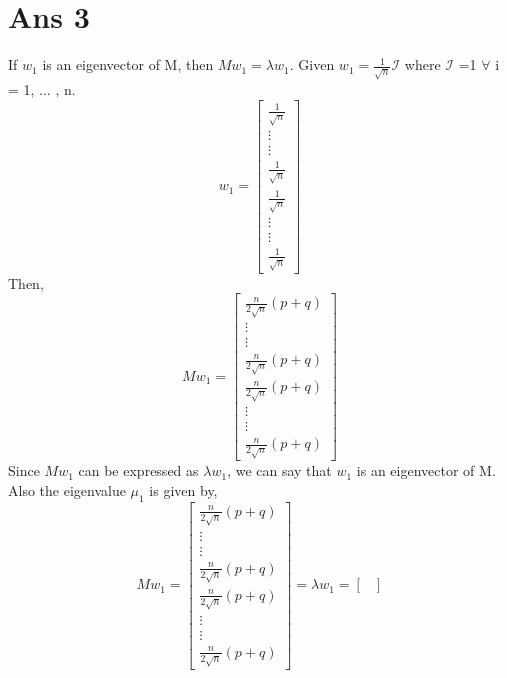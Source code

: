 \documentclass[10pt]{article}
\begin{document}
\section*{Ans 3}
\begin{flushleft}
If $w_{1}$ is an eigenvector of M, then $Mw_{1} = \lambda w_{1}$. Given $w_{1} = \frac{1}{\sqrt n} \mathcal{I}$ where $\mathcal{I}$ =1 $\forall$ i = 1, $\hdots$ , n.\\
\vspace{0.5em}
$$ w_{1} = 
\begin{bmatrix}
\frac{1}{\sqrt n}\\
\vdots\\
\vdots\\
\frac{1}{\sqrt n}\\
\frac{1}{\sqrt n}\\
\vdots\\
\vdots\\
\frac{1}{\sqrt n}
\end{bmatrix}
$$
Then, \\
\vspace{0.5em}
$$ Mw_{1} = 
\begin{bmatrix}
\frac{n}{2 \sqrt n} (p+q)\\
\vdots\\
\vdots\\
\frac{n}{2 \sqrt n} (p+q)\\
\frac{n}{2 \sqrt n} (p+q)\\
\vdots\\
\vdots\\
\frac{n}{2 \sqrt n} (p+q)
\end{bmatrix}
$$
Since $Mw_{1}$ can be expressed as $\lambda w_{1}$, we can say that $w_{1}$ is an eigenvector of M. \\
\vspace{0.5em}
Also the eigenvalue $\mu_{1}$ is given by,\\
\vspace{0.5em}
$$ Mw_{1} = 
\begin{bmatrix}
\frac{n}{2 \sqrt n} (p+q)\\
\vdots\\
\vdots\\
\frac{n}{2 \sqrt n} (p+q)\\
\frac{n}{2 \sqrt n} (p+q)\\
\vdots\\
\vdots\\
\frac{n}{2 \sqrt n} (p+q)
\end{bmatrix}
= \lambda w_{1}
= \begin{bmatrix}

\end{bmatrix}$$
\end{flushleft}
\end{document}
